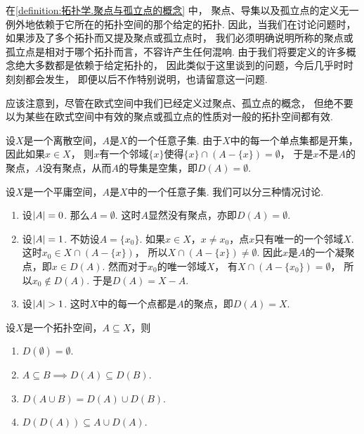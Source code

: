 在\cref{definition:拓扑学.聚点与孤立点的概念} 中，
聚点、导集以及孤立点的定义无一例外地依赖于它所在的拓扑空间的那个给定的拓扑.
因此，当我们在讨论问题时，
如果涉及了多个拓扑而又提及聚点或孤立点时，
我们必须明确说明所称的聚点或孤立点是相对于哪个拓扑而言，不容许产生任何混响.
由于我们将要定义的许多概念绝大多数都是依赖于给定拓扑的，
因此类似于这里谈到的问题，今后几乎时时刻刻都会发生，
即便以后不作特别说明，也请留意这一问题.

应该注意到，尽管在欧式空间中我们已经定义过聚点、孤立点的概念，
但绝不要以为某些在欧式空间中有效的聚点或孤立点的性质对一般的拓扑空间都有效.

\begin{example}[离散空间中的聚点]\label{example:拓扑学.离散空间中的聚点}
设\(X\)是一个离散空间，\(A\)是\(X\)的一个任意子集.
由于\(X\)中的每一个单点集都是开集，因此如果\(x \in X\)，
则\(x\)有一个邻域\(\{x\}\)使得\(\{x\}\cap(A-\{x\})=\emptyset\)，
于是\(x\)不是\(A\)的聚点，\(A\)没有聚点，从而\(A\)的导集是空集，即\(D(A)=\emptyset\).
\end{example}

\begin{example}[平庸空间中的聚点]\label{example:拓扑学.平庸空间中的聚点}
设\(X\)是一个平庸空间，\(A\)是\(X\)中的一个任意子集.
我们可以分三种情况讨论.
\begin{enumerate}
	\item 设\(\abs{A} = 0\).
	那么\(A = \emptyset\).
	这时\(A\)显然没有聚点，亦即\(D(A) = \emptyset\).

	\item 设\(\abs{A} = 1\).
	不妨设\(A = \{x_0\}\).
	如果\(x \in X\)，\(x \neq x_0\)，点\(x\)只有唯一的一个邻域\(X\).
	这时\(x_0 \in X \cap (A - \{x\})\)，
	所以\(X \cap (A - \{x\}) \neq \emptyset\).
	因此\(x\)是\(A\)的一个凝聚点，即\(x \in D(A)\).
	然而对于\(x_0\)的唯一邻域\(X\)，
	有\(X \cap (A - \{x_0\}) = \emptyset\)，
	所以\(x_0 \notin D(A)\).
	于是\(D(A) = X - A\).

	\item 设\(\abs{A} > 1\).
	这时\(X\)中的每一个点都是\(A\)的聚点，即\(D(A) = X\).
\end{enumerate}
\end{example}

\begin{theorem}
设\(X\)是一个拓扑空间，\(A \subseteq X\)，则
\begin{enumerate}
	\item \(D(\emptyset) = \emptyset\).
	\item \(A \subseteq B \implies D(A) \subseteq D(B)\).
	\item \(D(A \cup B) = D(A) \cup D(B)\).
	\item \(D(D(A)) \subseteq A \cup D(A)\).
\end{enumerate}
\end{theorem}


